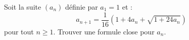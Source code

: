 Soit la suite $(a_n)$ définie par $a_1 = 1$ et :
\[
a_{n+1} = \frac{1}{16}\left(1 + 4a_n + \sqrt{1 + 24a_n}\right)
\]
pour tout $n \geq 1$. Trouver une formule close pour $a_n$.
